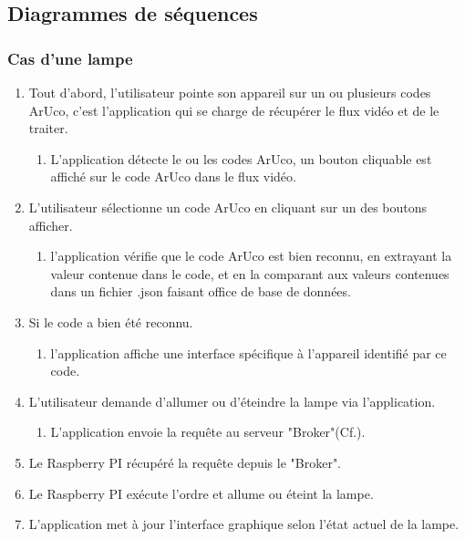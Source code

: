 \documentclass[12pt,a4paper]{article}
\begin{document}
\subsection{Diagrammes de séquences}
\subsubsection{Cas d'une lampe}
\begin{enumerate}
\item Tout d'abord, l'utilisateur pointe son appareil sur un ou plusieurs codes ArUco, c'est l'application qui se charge de récupérer le flux vidéo et de le traiter.
	\begin{enumerate}
	\item L'application détecte le ou les codes ArUco, un bouton cliquable est affiché sur le code ArUco dans le flux vidéo.
	\end{enumerate}
\item L'utilisateur sélectionne un code ArUco en cliquant sur un des boutons afficher.
	\begin{enumerate}
	\item l'application vérifie que le code ArUco est bien reconnu, en extrayant la valeur contenue dans le code, et en la comparant aux valeurs contenues dans un fichier .json faisant office de base de données. 
	\end{enumerate}
\item Si le code a bien été reconnu.
	\begin{enumerate}
	\item l'application affiche une interface spécifique à l'appareil identifié par ce code.
	\end{enumerate}
\item L'utilisateur demande d'allumer ou d'éteindre la lampe via l'application.
	\begin{enumerate}
	\item L'application envoie la requête au serveur "Broker"(Cf.\cite{Ref32}).
	\end{enumerate}
\item Le Raspberry PI récupéré la requête depuis le "Broker".%
\item Le Raspberry PI exécute l'ordre et allume ou éteint la lampe.
\item L'application met à jour l'interface graphique selon l'état actuel de la lampe.
\end{enumerate}
\newpage
\end{document}
